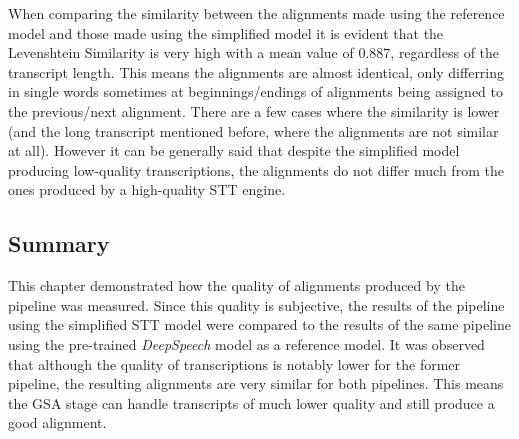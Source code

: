 When comparing the similarity between the alignments made using the reference model and those made using the simplified model it is evident that the Levenshtein Similarity is very high with a mean value of $0.887$, regardless of the transcript length. This means the alignments are almost identical, only differring in single words sometimes at beginnings/endings of alignments being assigned to the previous/next alignment. There are a few cases where the similarity is lower (and the long transcript mentioned before, where the alignments are not similar at all). However it can be generally said that despite the simplified model producing low-quality transcriptions, the alignments do not differ much from the ones produced by a high-quality \ac{STT} engine.

\subsection{Summary}

This chapter demonstrated how the quality of alignments produced by the pipeline was measured. Since this quality is subjective, the results of the pipeline using the simplified \ac{STT} model were compared to the results of the same pipeline using the pre-trained \textit{DeepSpeech} model as a reference model. It was observed that although the quality of transcriptions is notably lower for the former pipeline, the resulting alignments are very similar for both pipelines. This means the \ac{GSA} stage can handle transcripts of much lower quality and still produce a good alignment.